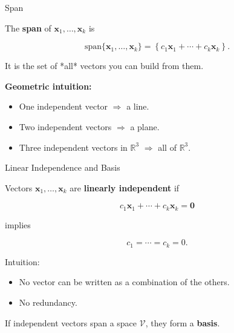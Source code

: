 \documentclass[aspectratio=169, handout, t]{beamer}
\numberwithin{equation}{section}
\begin{document}
\begin{frame}{Span}

The \textbf{span} of $\bm{x}_1, \ldots, \bm{x}_k$ is

\[
\text{span}\{\bm{x}_1, \ldots, \bm{x}_k\}
=
\left\{
c_1 \bm{x}_1 + \cdots + c_k \bm{x}_k
\right\}.
\]

\vspace{0.4cm}

It is the set of *all* vectors you can build from them.

\vspace{0.4cm}

\textbf{Geometric intuition:}

\begin{itemize}
    \item One independent vector $\Rightarrow$ a line.\pause
    \item Two independent vectors $\Rightarrow$ a plane.
    \item Three independent vectors in $\mathbb{R}^3$ $\Rightarrow$ all of $\mathbb{R}^3$.
\end{itemize}

\end{frame}
\begin{frame}{Linear Independence and Basis}

Vectors $\bm{x}_1, \ldots, \bm{x}_k$ are
\textbf{linearly independent} if

\[
c_1 \bm{x}_1 + \cdots + c_k \bm{x}_k = \bm{0}
\]

implies

\[
c_1 = \cdots = c_k = 0.
\]

\vspace{0.4cm}

Intuition:
\begin{itemize}
    \item No vector can be written as a combination of the others.
    \item No redundancy.
\end{itemize}

\vspace{0.4cm}\pause

If independent vectors span a space $\mathcal{V}$,
they form a \textbf{basis}.

\end{frame}
\end{document}
